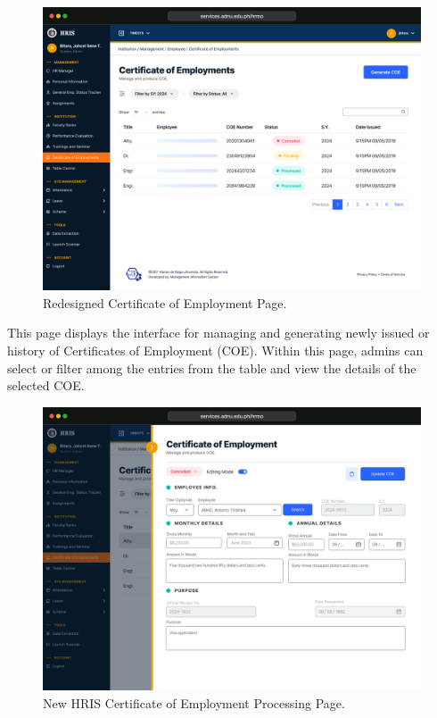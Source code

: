     \begin{figure}[H]
        \centering
        \includegraphics[width=1\linewidth]{figures/app/coe.png}
        \caption{Redesigned Certificate of Employment Page.}
        \label{fig:app-coe}
    \end{figure}

    This page displays the interface for managing and generating newly issued or history of Certificates of Employment (COE). Within this page, admins can select or filter among the entries from the table and view the details of the selected COE. 

    \begin{figure}[H]
        \centering
        \includegraphics[width=1\linewidth]{figures/app/coe-info.png}
        \caption{New HRIS Certificate of Employment Processing Page.}
        \label{fig:app-coe-info}
    \end{figure}

